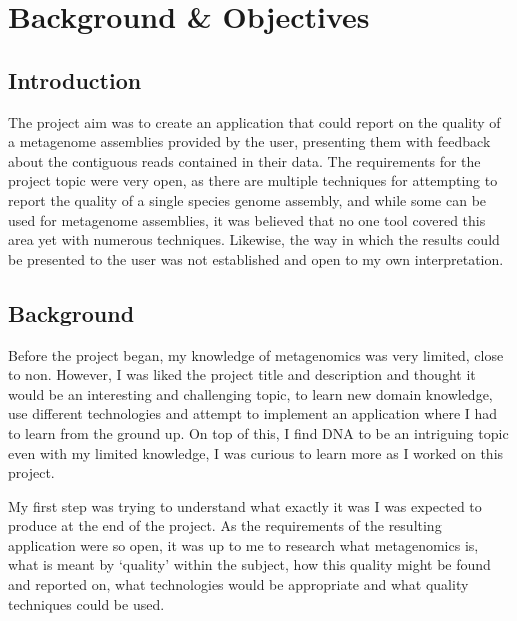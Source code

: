 \chapter{Background \& Objectives}


\section{Introduction}
The project aim was to create an application that could report on the quality of a metagenome assemblies  provided by the user, presenting them with feedback about the contiguous reads contained in their data. The requirements for the project topic were very open, as there are multiple techniques for attempting to report the quality of a single species genome assembly, and while some can be used for metagenome assemblies, it was believed that no one tool covered this area yet with numerous techniques. Likewise, the way in which the results could be presented to the user was not established and open to my own interpretation.


\section{Background}
Before the project began, my knowledge of metagenomics was very limited, close to non. However, I was liked the project title and description and thought it would be an interesting and challenging topic, to learn new domain knowledge, use different technologies and attempt to implement an application where I had to learn from the ground up. On top of this, I find DNA to be an intriguing topic even with my limited knowledge, I was curious to learn more as I worked on this project.

My first step was trying to understand what exactly it was I was expected to produce at the end of the project. As the requirements of the resulting application were so open, it was up to me to research what metagenomics is, what is meant by `quality' within the subject, how this quality might be found and reported on, what technologies would be appropriate and what quality techniques could be used.

